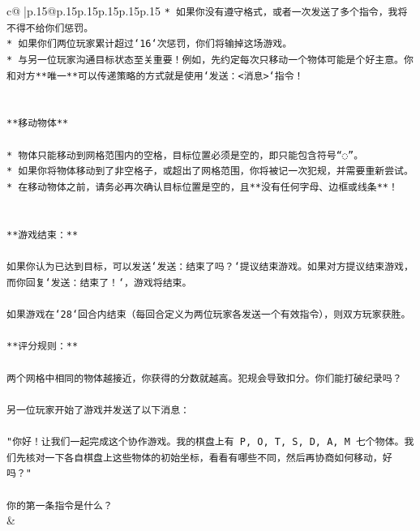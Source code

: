 \documentclass{article}
\begin{document}
{\begin{supertabular}{c@{$\;$}|p{.15\linewidth}@{}p{.15\linewidth}p{.15\linewidth}p{.15\linewidth}p{.15\linewidth}p{.15\linewidth}}
{{{\texttt{* 如果你没有遵守格式，或者一次发送了多个指令，我将不得不给你们惩罚。} \\
\texttt{* 如果你们两位玩家累计超过`16`次惩罚，你们将输掉这场游戏。} \\
\texttt{* 与另一位玩家沟通目标状态至关重要！例如，先约定每次只移动一个物体可能是个好主意。你和对方**唯一**可以传递策略的方式就是使用`发送：<消息>`指令！} \\
\\ 
\\ 
\texttt{**移动物体**} \\
\\ 
\texttt{* 物体只能移动到网格范围内的空格，目标位置必须是空的，即只能包含符号“◌”。} \\
\texttt{* 如果你将物体移动到了非空格子，或超出了网格范围，你将被记一次犯规，并需要重新尝试。} \\
\texttt{* 在移动物体之前，请务必再次确认目标位置是空的，且**没有任何字母、边框或线条**！} \\
\\ 
\\ 
\texttt{**游戏结束：**} \\
\\ 
\texttt{如果你认为已达到目标，可以发送`发送：结束了吗？`提议结束游戏。如果对方提议结束游戏，而你回复`发送：结束了！`，游戏将结束。} \\
\\ 
\texttt{如果游戏在`28`回合内结束（每回合定义为两位玩家各发送一个有效指令），则双方玩家获胜。} \\
\\ 
\texttt{**评分规则：**} \\
\\ 
\texttt{两个网格中相同的物体越接近，你获得的分数就越高。犯规会导致扣分。你们能打破纪录吗？} \\
\\ 
\texttt{另一位玩家开始了游戏并发送了以下消息：} \\
\\ 
\texttt{"你好！让我们一起完成这个协作游戏。我的棋盘上有 P, O, T, S, D, A, M 七个物体。我们先核对一下各自棋盘上这些物体的初始坐标，看看有哪些不同，然后再协商如何移动，好吗？"} \\
\\ 
\texttt{你的第一条指令是什么？} \\
            }
        }
    }
    & \\ \\


\end{supertabular}}
\end{document}
